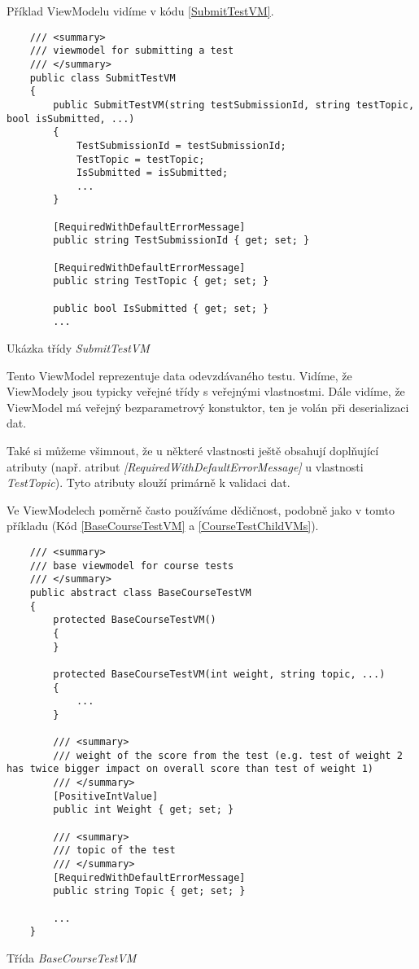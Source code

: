 Příklad ViewModelu vidíme v kódu \ref{SubmitTestVM}.

\begin{program}
	\begin{lstlisting}
	/// <summary>
	/// viewmodel for submitting a test
	/// </summary>
	public class SubmitTestVM
	{	
		public SubmitTestVM(string testSubmissionId, string testTopic, bool isSubmitted, ...)
		{
			TestSubmissionId = testSubmissionId;
			TestTopic = testTopic;
			IsSubmitted = isSubmitted;
			...
		}
		
		[RequiredWithDefaultErrorMessage]
		public string TestSubmissionId { get; set; }
		
		[RequiredWithDefaultErrorMessage]
		public string TestTopic { get; set; }
		
		public bool IsSubmitted { get; set; }
		...
	\end{lstlisting}
	\caption{Ukázka třídy \textit{SubmitTestVM}}
	\label{SubmitTestVM}
\end{program}

Tento ViewModel reprezentuje data odevzdávaného testu. Vidíme, že ViewModely jsou typicky veřejné třídy s veřejnými vlastnostmi. Dále vidíme, že ViewModel má veřejný bezparametrový konstuktor, ten je volán při deserializaci dat.

Také si můžeme všimnout, že u některé vlastnosti ještě obsahují doplňující atributy (např. atribut \textit{[RequiredWithDefaultErrorMessage]} u vlastnosti \textit{TestTopic}). Tyto atributy slouží primárně k validaci dat.

Ve ViewModelech poměrně často používáme dědičnost, podobně jako v tomto příkladu (Kód \ref{BaseCourseTestVM} a \ref{CourseTestChildVMs}).

\begin{program}
	\begin{lstlisting}
	/// <summary>
	/// base viewmodel for course tests
	/// </summary>
	public abstract class BaseCourseTestVM
	{
		protected BaseCourseTestVM()
		{
		}
		
		protected BaseCourseTestVM(int weight, string topic, ...)
		{
			...
		}
		
		/// <summary>
		/// weight of the score from the test (e.g. test of weight 2 has twice bigger impact on overall score than test of weight 1)
		/// </summary>
		[PositiveIntValue]
		public int Weight { get; set; }
		
		/// <summary>
		/// topic of the test
		/// </summary>
		[RequiredWithDefaultErrorMessage]
		public string Topic { get; set; }
	
		...
	}
	\end{lstlisting}
	\caption{Třída \textit{BaseCourseTestVM}}
	\label{BaseCourseTestVM}
\end{program}

